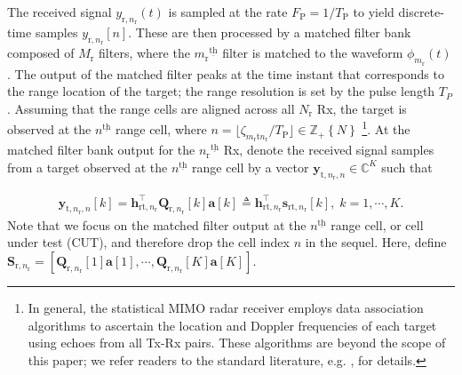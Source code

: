\documentclass[10pt,journal]{IEEEtran}
\newcommand{\paren}[1]{\left({#1}\right)}
\newcommand{\bracket}[1]{{\left [{#1}\right ]}}
\newcommand{\braces}[1]{{\left\{ {#1}\right\}}}
\newcommand{\ith}[1]    {{#1}^{\underline{\text{th}}}}
\newcommand{\rr}{_\mathrm{r}}
\newcommand{\rnr}{_{\mathrm{r},n_\mathrm{r}}}
\newcommand{\target}{\mathrm{t}}
\newcommand{\sfrac}[2]{#1/#2}
\theoremstyle{definition}
\begin{document}
The received signal $y_{\mathrm{r},n\rr}(t)$ is sampled at the rate $F_\textrm{P}=1/T_\textrm{P}$ to yield discrete-time samples $y_{\mathrm{r},n\rr}\bracket{n}$. These are then processed by a matched filter bank composed of $M\rr$ filters, where the $\ith{m\rr}$ filter is matched to the waveform $\phi_{m_\mathrm{r}}(t)$ %
\cite{MCMIMO_Rad}. The output of the matched filter peaks at the time instant that corresponds to the range location of the target; the range resolution is set by the pulse length $T_\mathit{P}$ \cite{richards2010principles}. Assuming that the range cells are aligned \cite{mishra2019cognitive} across all $N\rr$ Rx, the target is observed at the $\ith{n}$ range cell, where $n=\lfloor \sfrac{\zeta_{m\rr \target n\rr}}{T_\mathrm{P}}\rfloor\in\mathbb{Z}_+\braces{N}$ %
\footnote{In general, the statistical MIMO radar receiver employs data association algorithms to ascertain the location and Doppler frequencies of each target using echoes from all Tx-Rx pairs. These algorithms are beyond the scope of this paper; we refer readers to the standard literature, e.g. \cite{Nayebi13dataassociation}, for details. %
}. At the matched filter bank output for the $\ith{n\rr}$ Rx, denote the received signal samples from a target observed at the $\ith{n}$ range cell by a vector $\mathbf{y}_{\mathrm{t},n\rr,n}\in\mathbb{C}^{K}$ such that %
\par\noindent\small 
\begin{align}\label{radar range cell}
	\mathbf{y}_{\mathrm{t},n\rr,n}\bracket{k}=\mathbf{h}^\top_{\mathrm{rt},n\rr}\mathbf{Q}_{\mathrm{r,}n\rr}\bracket{k}\mathbf{a}\bracket{k}\triangleq\mathbf{h}^\top_{\mathrm{rt},n\rr}\mathbf{s}_{\mathrm{rt,}n\rr}\bracket{k},\; k =1,\cdots,K.
\end{align}\normalsize
Note that we focus on the matched filter output at the $\ith{n}$ range cell, or cell under test (CUT), and therefore drop the cell index $n$ in the sequel.  Here, define $\mathbf{S}\rnr=\bracket{\mathbf{Q}\rnr\bracket{1}\mathbf{a}\bracket{1},\cdots,\mathbf{Q}\rnr\bracket{K}\mathbf{a}\bracket{K}}$. 
\end{document}
